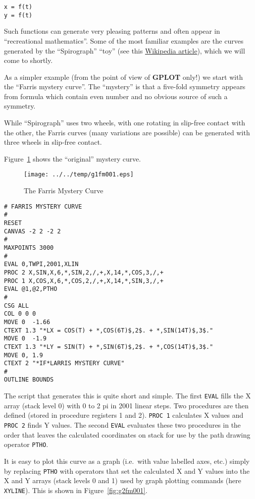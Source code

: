 \documentclass[a4paper,twoside,11pt]{article}
\makeatletter
\def\maxwidth{%
  \ifdim\Gin@nat@width>\linewidth
    \linewidth
  \else
    \Gin@nat@width
  \fi
}
\newcommand{\newpara}{\par\vspace{4mm}\noindent}
\makeatother
\begin{document}
\begin{lstlisting}
x = f(t)
y = f(t)
\end{lstlisting}

\newpara
Such functions can generate very pleasing patterns and often appear in
``recreational mathematics''. Some of the most familiar examples are the
curves generated by the ``Spirograph'' ``toy'' (see this
\href{https://en.wikipedia.org/wiki/Spirograph}{Wikipedia article}),
which we will come to shortly.

\newpara
As a simpler example (from the point of view of \textbf{GPLOT} only!) we start
with the ``Farris mystery curve''. The ``mystery'' is that a five-fold
symmetry appears from formula which contain even number and no obvious
source of such a symmetry.

\newpara
While ``Spirograph'' uses two wheels, with one rotating in slip-free
contact with the other, the Farris curves (many variations are possible)
can be generated with three wheels in slip-free contact.

\newpara
Figure~\ref{fig:g1fm001} shows the ``original'' mystery curve.

\begin{figure}
  \centering
  \texttt{[image: ../../temp/g1fm001.eps]}
  \caption{The Farris Mystery Curve}
  \label{fig:g1fm001}
\end{figure}

\begin{lstlisting}
# FARRIS MYSTERY CURVE
#
RESET
CANVAS -2 2 -2 2
#
MAXPOINTS 3000
#
EVAL 0,TWPI,2001,XLIN
PROC 2 X,SIN,X,6,*,SIN,2,/,+,X,14,*,COS,3,/,+
PROC 1 X,COS,X,6,*,COS,2,/,+,X,14,*,SIN,3,/,+
EVAL @1,@2,PTHO
#
CSG ALL
COL 0 0 0
MOVE 0  -1.66
CTEXT 1.3 "*LX = COS(T) + *,COS(6T)$,2$. + *,SIN(14T)$,3$." 
MOVE 0  -1.9
CTEXT 1.3 "*LY = SIN(T) + *,SIN(6T)$,2$. + *,COS(14T)$,3$." 
MOVE 0, 1.9
CTEXT 2 "*IF*LARRIS MYSTERY CURVE"
#
OUTLINE BOUNDS
\end{lstlisting}

\newpara
The script that generates this is quite short and simple. The first
\texttt{EVAL} fills the X array (stack level 0) with 0 to 2 pi in 2001
linear steps. Two procedures are then defined (stored in procedure
registers 1 and 2). \texttt{PROC\ 1} calculates X values and
\texttt{PROC\ 2} finds Y values. The second \texttt{EVAL} evaluates
these two procedures in the order that leaves the calculated coordinates
on stack for use by the path drawing operator \texttt{PTHO}.

\newpara
It is easy to plot this curve as a graph (i.e.~with value labelled axes,
etc.) simply by replacing \texttt{PTHO} with operators that set the
calculated X and Y values into the X and Y arrays (stack levels 0 and 1)
used by graph plotting commands (here \texttt{XYLINE}). This is
shown in Figure~\ref{fig:g2fm001}.
\end{document}
